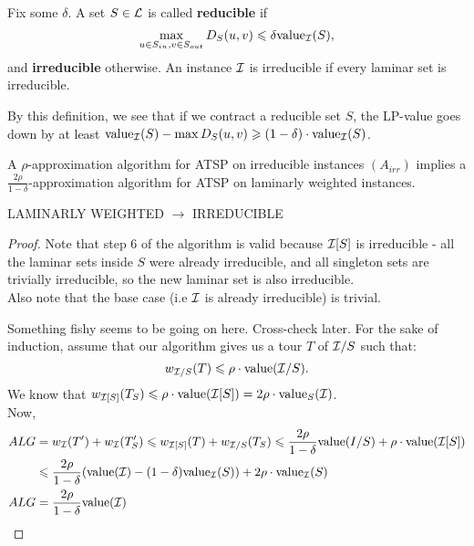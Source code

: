 \documentclass[./main.tex]{subfiles}
\begin{document}
	\begin{definition}
		Fix some $\delta$. A set $S\in \mathcal{L}$ is called \textbf{reducible} if 
		\[
			\max_{u\in S_{in}, v\in S_{out}}D_S(u,v)\leqslant \delta \textup{value}_{\mathcal{I}}(S),
		\] 
		and \textbf{irreducible} otherwise. 
		An instance $\mathcal{I}$ is irreducible if every laminar set is irreducible.
	\end{definition}
	
	By this definition, we see that if we contract a reducible set $S$, the LP-value goes down by at least $\textup{value}_{\mathcal{I}}(S) - \max D_S(u,v)\geqslant(1-\delta)\cdot \textup{value}_{\mathcal{I}}(S)$.\\
	
	\begin{theorem} 
		A $\rho$-approximation algorithm for ATSP on irreducible instances $(A_{irr})$ implies a $\frac{2\rho}{1-\delta}$-approximation algorithm for ATSP on laminarly weighted instances.
	\end{theorem}
	\begin{algorithm}\label{alg:1}
		\caption{LAMINARLY WEIGHTED $\rightarrow$ IRREDUCIBLE}
	\end{algorithm}
	\begin{proof}
		Note that step 6 of the algorithm is valid because $\mathcal{I}[S]$ is irreducible - all the laminar sets inside $S$ were already irreducible, and all singleton sets are trivially irreducible, so the new laminar set is also irreducible.\\
		Also note that the base case (i.e $\mathcal{I}$ is already irreducible) is trivial.
		
		{\color{red} Something fishy seems to be going on here. Cross-check later.}
		For the sake of induction, assume that our algorithm gives us a tour $T$ of $\mathcal{I}/S$ such that: 
		\[
			w_{\mathcal{I}/S}(T) \leqslant \rho\cdot \textup{value}(\mathcal{I}/S).
		\]
		We know that $w_{\mathcal{I}[S]}(T_S)\leqslant \rho\cdot \textup{value}(\mathcal{I}[S]) = 2\rho\cdot\textup{value}_S(\mathcal{I})$.\\
		Now,
		\begin{align*}
				ALG &= w_{\mathcal{I}}(T') + w_{\mathcal{I}}(T_S') \leqslant w_{\mathcal{I}[S]}(T) + w_{\mathcal{I}/S}(T_S) \leqslant \frac{2\rho}{1-\delta}\textup{value}(I/S) + \rho\cdot \textup{value}(\mathcal{I}[S])\\
				&\leqslant \frac{2\rho}{1-\delta}(\textup{value}(\mathcal{I}) - (1-\delta) \textup{value}_{\mathcal{I}}(S)) + 2\rho\cdot\textup{value}_{\mathcal{I}}(S)\\
				ALG &= \frac{2\rho}{1-\delta} \textup{value}(\mathcal{I})
		\end{align*}
	\end{proof}
\end{document}
